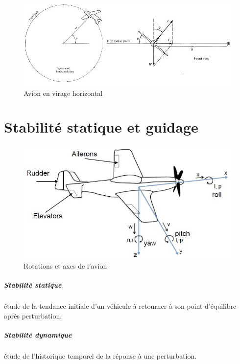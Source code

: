 \documentclass{report}
\begin{document}
\begin{figure}[h!]
    \centering
    \includegraphics[scale=0.75]{17.JPG}
    \caption{Avion en virage horizontal}
    \label{17}
\end{figure}

\chapter{Stabilité statique et guidage}

\begin{figure}[h!]
    \centering
    \includegraphics[scale=0.7]{18.JPG}
    \caption{Rotations et axes de l'avion}
    \label{18}
\end{figure}

\paragraph{Stabilité statique} étude de la tendance initiale d'un véhicule à retourner à son point d'équilibre après perturbation.

\paragraph{Stabilité dynamique} étude de l'historique temporel de la réponse à une perturbation.
\end{document}
